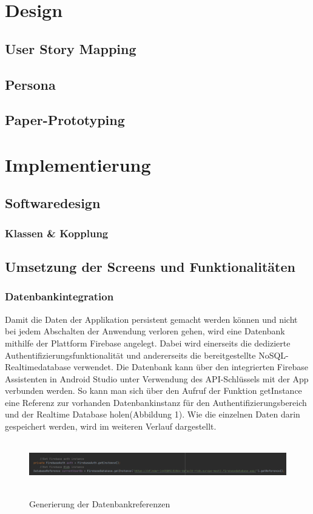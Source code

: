 \documentclass[12pt, a4paper, oneside]{article}
\begin{document}
\section{Design}
\subsection{User Story Mapping}
\subsection{Persona}
\subsection{Paper-Prototyping}

\section{Implementierung}
\subsection{Softwaredesign}
\subsubsection{Klassen \& Kopplung}
\subsection{Umsetzung der Screens und Funktionalitäten}
\subsubsection{Datenbankintegration}
Damit die Daten der Applikation persistent gemacht werden können und nicht bei jedem Abschalten der Anwendung verloren gehen, wird eine Datenbank mithilfe der Plattform Firebase angelegt. Dabei wird einerseits die dedizierte Authentifizierungsfunktionalität und andererseits die bereitgestellte NoSQL-Realtimedatabase verwendet. Die Datenbank kann über den integrierten Firebase Assistenten in Android Studio unter Verwendung des API-Schlüssels mit der App verbunden werden. So kann man sich über den Aufruf der Funktion getInstance eine Referenz zur vorhanden Datenbankinstanz für den Authentifizierungsbereich und der Realtime Database holen(Abbildung 1). Wie die einzelnen Daten darin gespeichert werden, wird im weiteren Verlauf dargestellt.\\
\newpage
\begin{figure}
\includegraphics[width=1\textwidth, height=2cm]{firebase_connect.png}
\centering
\label{input_check}
\caption{Generierung der Datenbankreferenzen}
\end{figure}
\end{document}
